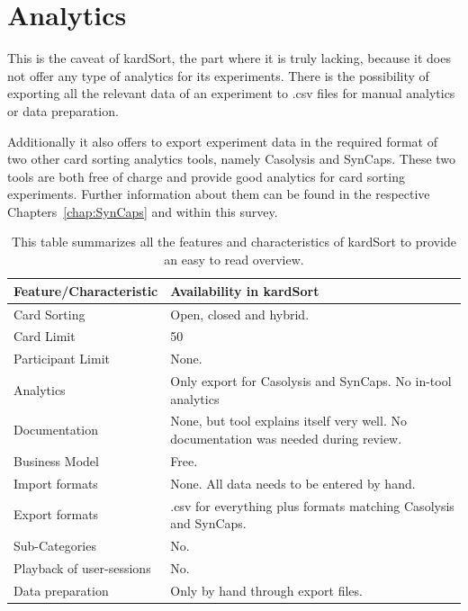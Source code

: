 \section{Analytics} This is the caveat of kardSort, the part where it
is truly lacking, because it does not offer any type of analytics for
its experiments. There is the  possibility of exporting all the
relevant data of an experiment to .csv files for manual analytics or
data preparation. 

Additionally it also offers to export experiment data in the required
format of two other card sorting analytics tools, namely Casolysis and
SynCaps. These two tools are both free of charge and provide good
analytics for card sorting experiments. Further information about them
can be found in the respective Chapters~\ref{chap:SynCaps} and
 within this survey.

\begin{table}[tp]
\centering
\begin{tabularx}
{\linewidth}{|l|X|}
\hline \textbf{Feature/Characteristic} & \textbf{Availability in kardSort} \\ 
\hline Card Sorting & Open, closed and hybrid. \\ 
\hline Card Limit & 50 \\
\hline Participant Limit & None. \\
\hline Analytics & Only export for Casolysis and SynCaps. No in-tool
analytics \\ 
\hline Documentation & None, but tool explains itself very well. No 
documentation was needed during review. \\
\hline Business Model & Free. \\
\hline Import formats & None. All data needs to be entered by hand.\\ 
\hline Export formats & .csv for everything plus formats matching
Casolysis and SynCaps. \\ 
\hline Sub-Categories & No. \\ 
\hline Playback of user-sessions & No. \\ 
\hline Data preparation & Only by hand through export files. \\ 
\hline
\end{tabularx} 
\caption[Feature summary of kardSort] 
{ 
This table summarizes all the features and characteristics of kardSort
to provide an easy to read overview.
}
\label{tab:features-kardSort}
\end{table}


